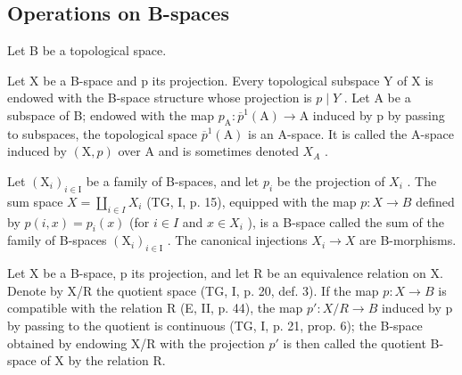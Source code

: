 \subsection{Operations on B-spaces}

Let B be a topological space.

Let X be a B-space and p its projection. Every topological subspace Y of X is endowed with the B-space structure whose projection is \(p \mid Y\) . Let A be a subspace of B; endowed with the map \(p_{\mathrm{A}}: \overline{p}^{1}(\mathrm{A}) \to \mathrm{A}\) induced by p by passing to subspaces, the topological space \(\overline{p}^{1}(\mathrm{A})\) is an A-space. It is called the A-space induced by \((\mathrm{X}, p)\) over A and is sometimes denoted \(X_{A}\) .

Let \((\mathrm{X}_{i})_{i\in\mathrm{I}}\) be a family of B-spaces, and let \(p_{i}\) be the projection of \(X_{i}\) . The sum space \(X = \coprod_{i\in I} X_{i}\) (TG, I, p. 15), equipped with the map \(p: X \to B\) defined by \(p(i,x) = p_{i}(x)\) (for \(i \in I\) and \(x \in X_{i}\) ), is a B-space called the sum of the family of B-spaces \((\mathrm{X}_{i})_{i\in\mathrm{I}}\) . The canonical injections \(X_{i} \to X\) are B-morphisms.

Let X be a B-space, p its projection, and let R be an equivalence relation on X. Denote by X/R the quotient space (TG, I, p. 20, def. 3). If the map \(p: X \rightarrow B\) is compatible with the relation R (E, II, p. 44), the map \(p'\colon X/R \to B\) induced by p by passing to the quotient is continuous (TG, I, p. 21, prop. 6); the B-space obtained by endowing X/R with the projection \(p'\) is then called the quotient B-space of X by the relation R.

